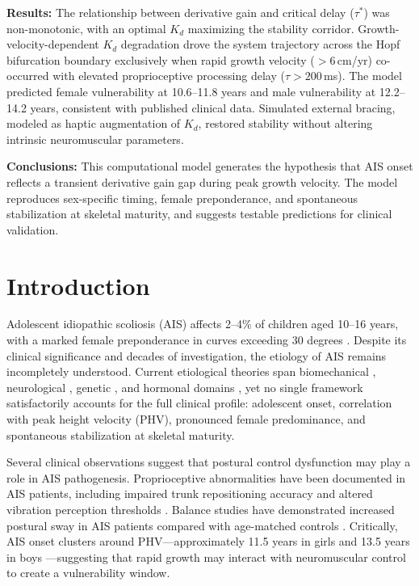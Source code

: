 \documentclass[12pt,a4paper]{article}
\begin{document}
\noindent\textbf{Results:}
The relationship between derivative gain and critical delay ($\tau^*$) was non-monotonic, with an optimal $K_d$ maximizing the stability corridor. Growth-velocity-dependent $K_d$ degradation drove the system trajectory across the Hopf bifurcation boundary exclusively when rapid growth velocity ($>$6\,cm/yr) co-occurred with elevated proprioceptive processing delay ($\tau > 200$\,ms). The model predicted female vulnerability at 10.6--11.8 years and male vulnerability at 12.2--14.2 years, consistent with published clinical data. Simulated external bracing, modeled as haptic augmentation of $K_d$, restored stability without altering intrinsic neuromuscular parameters.

\noindent\textbf{Conclusions:}
This computational model generates the hypothesis that AIS onset reflects a transient derivative gain gap during peak growth velocity. The model reproduces sex-specific timing, female preponderance, and spontaneous stabilization at skeletal maturity, and suggests testable predictions for clinical validation.

\newpage

\section{Introduction}

Adolescent idiopathic scoliosis (AIS) affects 2--4\% of children aged 10--16 years, with a marked female preponderance in curves exceeding 30 degrees \citep{cheng2015prevalence, grivas2006scoliosis}. Despite its clinical significance and decades of investigation, the etiology of AIS remains incompletely understood. Current etiological theories span biomechanical \citep{stokes2006hueter, villemure2009growth}, neurological \citep{lao2008proprioceptive, assaraf2020piezo2}, genetic \citep{sharma2011genome}, and hormonal domains \citep{burwell2009aetiopathogenesis}, yet no single framework satisfactorily accounts for the full clinical profile: adolescent onset, correlation with peak height velocity (PHV), pronounced female predominance, and spontaneous stabilization at skeletal maturity.

Several clinical observations suggest that postural control dysfunction may play a role in AIS pathogenesis. Proprioceptive abnormalities have been documented in AIS patients, including impaired trunk repositioning accuracy and altered vibration perception thresholds \citep{lao2008proprioceptive, simoneau2006altered}. Balance studies have demonstrated increased postural sway in AIS patients compared with age-matched controls \citep{dalleau2012postural}. Critically, AIS onset clusters around PHV---approximately 11.5 years in girls and 13.5 years in boys \citep{sanders2017maturity}---suggesting that rapid growth may interact with neuromuscular control to create a vulnerability window.
\end{document}

